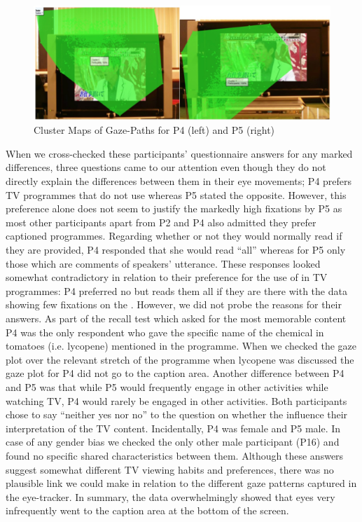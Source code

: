\documentclass[output=paper]{langsci/langscibook}
\begin{document}
  
\begin{figure}[t]
 \includegraphics[width=\textwidth]{figures/OHagan7.png}
 \caption{Cluster Maps of Gaze-Paths for P4 (left) and P5 (right)}
\label{ohagan:fig:7}
\end{figure}


When we cross-checked these participants' questionnaire answers for any marked differences, three questions came to our attention even though they do not directly explain the differences between them in their eye movements; P4 prefers TV programmes that do not use  whereas P5 stated the opposite. However, this preference alone does not seem to justify the markedly high fixations by P5 as most other participants apart from P2 and P4 also admitted they prefer captioned programmes. Regarding whether or not they would normally read  if they are provided, P4 responded that she would read ``all'' whereas for P5 only those  which are comments of speakers' utterance. These responses looked somewhat contradictory in relation to their preference for the use of  in TV programmes: P4 preferred no  but reads them all if they are there with the  data showing few fixations on the . However, we did not probe the reasons for their answers. As part of the recall test which asked for the most memorable content P4 was the only respondent who gave the specific name of the chemical in tomatoes (i.e. lycopene) mentioned in the programme. When we checked the gaze plot over the relevant stretch of the programme when lycopene was discussed the gaze plot for P4 did not go to the caption area. Another difference between P4 and P5 was that while P5 would frequently engage in other activities while watching TV, P4 would rarely be engaged in other activities. Both participants chose to say ``neither yes nor no'' to the question on whether the  influence their interpretation of the TV content. Incidentally, P4 was female and P5 male. In case of any gender bias we checked the only other male participant (P16) and found no specific shared characteristics between them. Although these answers suggest somewhat different TV viewing habits and preferences, there was no plausible link we could make in relation to the different gaze patterns captured in the eye-tracker.  In summary, the  data overwhelmingly showed that eyes very infrequently went to the caption area at the bottom of the screen. 
\end{document}
